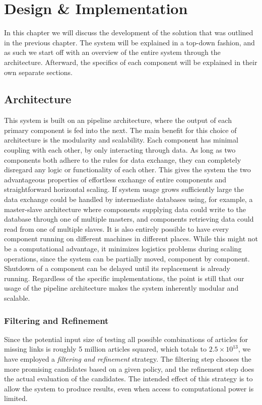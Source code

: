 \chapter{Design \& Implementation}\label{chap:design}
In this chapter we will discuss the development of the solution that was outlined in the previous chapter. The system will be explained in a top-down fashion, and as such we start off with an overview of the entire system through the architecture. Afterward, the specifics of each component will be explained in their own separate sections.

\section{Architecture}\label{sec:design_overview}
This system is built on an pipeline architecture, where the output of each primary component is fed into the next. The main benefit for this choice of architecture is the modularity and scalability. Each component has minimal coupling with each other, by only interacting through data. As long as two components both adhere to the rules for data exchange, they can completely disregard any logic or functionality of each other. This gives the system the two advantageous properties of effortless exchange of entire components and straightforward horizontal scaling. If system usage grows sufficiently large the data exchange could be handled by intermediate databases using, for example, a master-slave architecture where components supplying data could write to the database through one of multiple masters, and components retrieving data could read from one of multiple slaves. It is also entirely possible to have every component running on different machines in different places. While this might not be a computational advantage, it minimizes logistics problems during scaling operations, since the system can be partially moved, component by component. Shutdown of a component can be delayed until its replacement is already running. Regardless of the specific implementations, the point is still that our usage of the pipeline architecture makes the system inherently modular and scalable. 

\subsection{Filtering and Refinement}
Since the potential input size of testing all possible combinations of articles for missing links is roughly 5 million articles squared, which totals to $2.5 \times 10^{13}$, we have employed a \emph{filtering and refinement} strategy. The filtering step chooses the more promising candidates based on a given policy, and the refinement step does the actual evaluation of the candidates. The intended effect of this strategy is to allow the system to produce results, even when access to computational power is limited.

